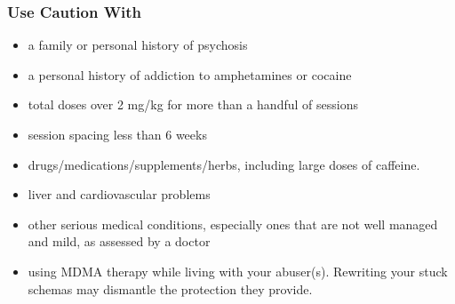 \documentclass[11pt,oneside]{book}
\let\cite\parencite
\begin{document}
\subsubsection*{Use Caution With}
\begin{itemize}
    \item a family or personal history of psychosis
    \item a personal history of addiction to amphetamines or cocaine
    \item total doses over 2 mg/kg for more than a handful of sessions
    \item session spacing less than 6 weeks
    \item drugs/medications/supplements/herbs, including large doses of caffeine. 
    \item liver and cardiovascular problems
    \item other serious medical conditions, especially ones that are not well managed and mild, as assessed by a doctor~\cite{mitchellMDMAClinicalTrial2}
    \item using MDMA therapy while living with your abuser(s). Rewriting your stuck schemas may dismantle the protection they provide.
\end{itemize}
\end{document}
